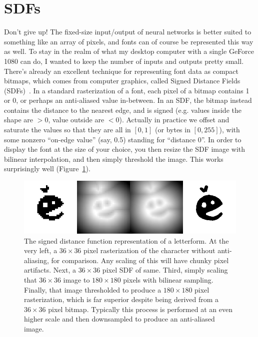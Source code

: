 \documentclass[twocolumn]{article}
\begin{document}




\section{SDFs}

Don't give up! The fixed-size input/output of neural networks is
better suited to something like an array of pixels, and fonts can of
course be represented this way as well. To stay in the realm of what
my desktop computer with a single GeForce 1080 can do, I wanted to
keep the number of inputs and outputs pretty small. There's already an
excellent technique for representing font data as compact bitmaps,
which comes from computer graphics, called Signed Distance Fields
(SDFs)~\cite{green2007improved}. In a standard rasterization of a
font, each pixel of a bitmap contains 1 or 0, or perhaps an
anti-aliased value in-between. In an SDF, the bitmap instead contains
the distance to the nearest edge, and is signed (e.g. values inside
the shape are $> 0$, value outside are $< 0$). Actually in
practice we offset and saturate the values so that they are all in
$[0,1]$ (or bytes in $[0,255]$), with some nonzero ``on-edge value''
(say, 0.5) standing for ``distance 0''. In order to display the font
at the size of your choice, you then resize the SDF image with bilinear
interpolation, and then simply threshold the image. This works
surprisingly well (Figure~\ref{fig:sdf}).

\begin{figure}[ht]
\centering
  \includegraphics[width=0.95 \linewidth]{sdf-figure}
\caption{
  The signed distance function representation of a letterform.
  At the very left, a $36\times 36$ pixel rasterization of
  the character without anti-aliasing, for comparison. Any
  scaling of this will have chunky pixel artifacts. Next,
  a $36\times 36$ pixel SDF of same. Third, simply scaling
  that $36\times 36$ image to $180 \times 180$ pixels with
  bilinear sampling. Finally, that image thresholded to
  produce a $180 \times 180$ pixel rasterization, which is
  far superior despite being derived from a $36 \times 36$ pixel
  bitmap. Typically this process is performed at an even higher
  scale and then downsampled to produce an anti-aliased image.
} \label{fig:sdf}
\end{figure}
\end{document}

